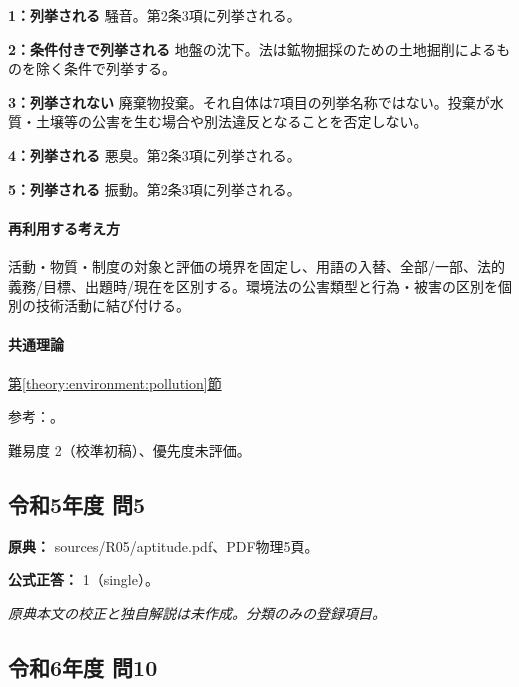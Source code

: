\noindent\textbf{1：列挙される} 騒音。第2条3項に列挙される。\par

\noindent\textbf{2：条件付きで列挙される} 地盤の沈下。法は鉱物掘採のための土地掘削によるものを除く条件で列挙する。\par

\noindent\textbf{3：列挙されない} 廃棄物投棄。それ自体は7項目の列挙名称ではない。投棄が水質・土壌等の公害を生む場合や別法違反となることを否定しない。\par

\noindent\textbf{4：列挙される} 悪臭。第2条3項に列挙される。\par

\noindent\textbf{5：列挙される} 振動。第2条3項に列挙される。\par

\paragraph{再利用する考え方} 活動・物質・制度の対象と評価の境界を固定し、用語の入替、全部/一部、法的義務/目標、出題時/現在を区別する。環境法の公害類型と行為・被害の区別を個別の技術活動に結び付ける。

\paragraph{共通理論} \hyperref[theory:environment:pollution]{第\ref*{theory:environment:pollution}節}

\par 参考：\cite{env_pollution}。

\par 難易度 2（校準初稿）、優先度未評価。

\subsection{令和5年度 問5}
\label{q:r05-reg-apt-05}

\noindent\textbf{原典：} sources/R05/aptitude.pdf、PDF物理5頁。

\textbf{公式正答：} 1（single）。

\par\textit{原典本文の校正と独自解説は未作成。分類のみの登録項目。}

\subsection{令和6年度 問10}
\label{q:r06-reg-apt-10}


